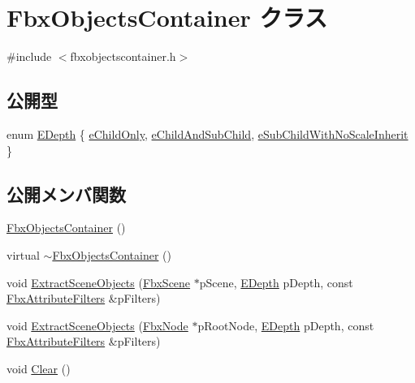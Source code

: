 \hypertarget{class_fbx_objects_container}{}\section{Fbx\+Objects\+Container クラス}
\label{class_fbx_objects_container}


{\ttfamily \#include $<$fbxobjectscontainer.\+h$>$}

\subsection*{公開型}
\begin{DoxyCompactItemize}
\item 
enum \hyperlink{class_fbx_objects_container_a70f47fef529be83cb1b45c0e067d73e5}{E\+Depth} \{ \hyperlink{class_fbx_objects_container_a70f47fef529be83cb1b45c0e067d73e5a8f0f79eb5473a347f5438586ef1d6874}{e\+Child\+Only}, 
\hyperlink{class_fbx_objects_container_a70f47fef529be83cb1b45c0e067d73e5a21904d2f9ea16c484da380962349eb83}{e\+Child\+And\+Sub\+Child}, 
\hyperlink{class_fbx_objects_container_a70f47fef529be83cb1b45c0e067d73e5a14f4e784039822e94a23b24d3f4c9bd5}{e\+Sub\+Child\+With\+No\+Scale\+Inherit}
 \}
\end{DoxyCompactItemize}
\subsection*{公開メンバ関数}
\begin{DoxyCompactItemize}
\item 
\hyperlink{class_fbx_objects_container_a48d3e8b9458cd4ec7ba67c02b537f353}{Fbx\+Objects\+Container} ()
\item 
virtual \hyperlink{class_fbx_objects_container_a1c5d2be12ce25c7f996f16dcc0b98c35}{$\sim$\+Fbx\+Objects\+Container} ()
\item 
void \hyperlink{class_fbx_objects_container_a1d60cd980f37affb7bcb64f9cf53f710}{Extract\+Scene\+Objects} (\hyperlink{class_fbx_scene}{Fbx\+Scene} $\ast$p\+Scene, \hyperlink{class_fbx_objects_container_a70f47fef529be83cb1b45c0e067d73e5}{E\+Depth} p\+Depth, const \hyperlink{fbxobjectscontainer_8h_a74af631b21bcb9d44e73d3293bf785df}{Fbx\+Attribute\+Filters} \&p\+Filters)
\item 
void \hyperlink{class_fbx_objects_container_a7fdcdc24f3c61c3f2001b13f16d7528d}{Extract\+Scene\+Objects} (\hyperlink{class_fbx_node}{Fbx\+Node} $\ast$p\+Root\+Node, \hyperlink{class_fbx_objects_container_a70f47fef529be83cb1b45c0e067d73e5}{E\+Depth} p\+Depth, const \hyperlink{fbxobjectscontainer_8h_a74af631b21bcb9d44e73d3293bf785df}{Fbx\+Attribute\+Filters} \&p\+Filters)
\item 
void \hyperlink{class_fbx_objects_container_aef67efbc03df0eb8c643a680bab44737}{Clear} ()
\end{DoxyCompactItemize}

